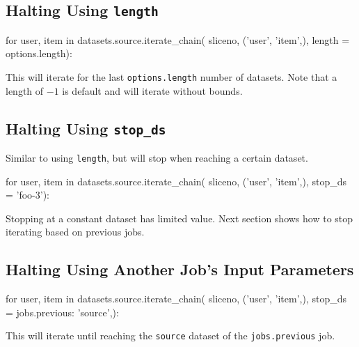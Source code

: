 \subsection{Halting Using \texttt{length}}
\begin{python}
for user, item in datasets.source.iterate_chain(
                       sliceno, ('user', 'item',),
                       length = options.length):
\end{python}
This will iterate for the last \texttt{options.length} number of
datasets.  Note that a length of $-1$ is default and will iterate
without bounds.


\subsection{Halting Using \texttt{stop\_ds}}
Similar to using \texttt{length}, but will stop when reaching a
certain dataset.
\begin{python}
for user, item in datasets.source.iterate_chain(
                       sliceno, ('user', 'item',),
                       stop_ds = 'foo-3'):
\end{python}
Stopping at a constant dataset has limited value.  Next section shows
how to stop iterating based on previous jobs.



\subsection{Halting Using Another Job's Input Parameters}
\begin{python}
for user, item in datasets.source.iterate_chain(
                       sliceno, ('user', 'item',),
                       stop_ds = {jobs.previous: 'source',}):
\end{python}
This will iterate until reaching the \texttt{source} dataset of
the \texttt{jobs.previous} job.



